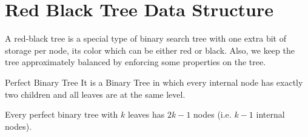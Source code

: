 \chapter{Red Black Tree Data Structure}
A red-black tree is a special type of binary search tree with one extra bit of storage per node, its color which can be either red or black. Also, we keep the tree approximately balanced by enforcing some properties on the tree.
\begin{definition}{Perfect Binary Tree}{}
	It is a Binary Tree in which every internal node has exactly two children and all leaves are at the same level.
\end{definition}
\begin{Lemma}{}{}
	Every perfect binary tree with $k$ leaves has $2k-1$  nodes (i.e. $k-1$ internal nodes).
\end{Lemma}
